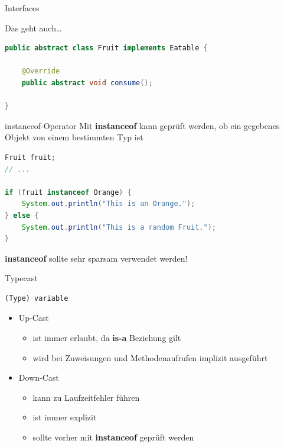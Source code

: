 \documentclass[18pt]{beamer}
\begin{document}
\begin{frame}[fragile]{Interfaces}

    Das geht auch\dots

    \begin{exampleblock}{}
        \begin{lstlisting}[language=Java,basicstyle=\scriptsize]
public abstract class Fruit implements Eatable {

    @Override
    public abstract void consume();

}
        \end{lstlisting}

    \end{exampleblock}
\end{frame}


\begin{frame}[fragile]{instanceof-Operator}
    Mit \textbf{instanceof} kann geprüft werden, ob ein gegebenes Objekt von einem bestimmten Typ ist
    \begin{exampleblock}{}
        \begin{lstlisting}[language=Java,basicstyle=\scriptsize]
Fruit fruit;
// ...

if (fruit instanceof Orange) {
    System.out.println("This is an Orange.");
} else {
    System.out.println("This is a random Fruit.");
}
        \end{lstlisting}

    \end{exampleblock}

    \pause

    \alert{\textbf{instanceof} sollte sehr sparsam verwendet werden!}

\end{frame}

\begin{frame}[fragile]{Typecast}
    \begin{lstlisting}
(Type) variable
    \end{lstlisting}

    \vspace{.2in}
    \begin{itemize}
        \item Up-Cast
            \begin{itemize}
                \item ist immer erlaubt, da \textbf{is-a} Beziehung gilt
                \item wird bei Zuweisungen und Methodenaufrufen implizit ausgeführt
            \end{itemize}
        \item Down-Cast
        \begin{itemize}
            \item kann zu Laufzeitfehler führen
            \item ist immer explizit
            \item sollte vorher mit \textbf{instanceof} geprüft werden
        \end{itemize}
    \end{itemize}
\end{frame}
\end{document}
